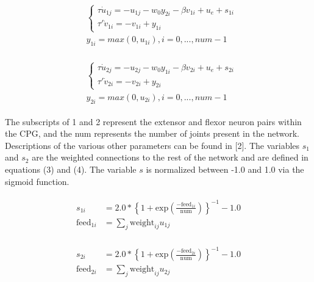 \documentclass{acm_proc_article-sp}
\begin{document}
\begin{multline}
\begin{aligned}
    &\begin{cases}
        \tau\dot{u}_{1j} = -u_{1j} - w_{0}y_{2i} - \beta v_{1i} + u_e + s_{1i} \\
        \tau'\dot{v}_{1i} = -v_{1i} + y_{1i}
    \end{cases}
    \\
    &y_{1i} = max(0, u_{1i}), i = 0,...,num-1
\end{aligned}
\end{multline}

\begin{multline}
\begin{aligned}
    &\begin{cases}
        \tau\dot{u}_{2j} = -u_{2j} - w_{0}y_{1i} - \beta v_{2i} + u_e + s_{2i} \\
        \tau'\dot{v}_{2i} = -v_{2i} + y_{2i}
    \end{cases}
    \\
    &y_{2i} = max(0, u_{2i}), i = 0,...,num-1
\end{aligned}
\end{multline}

The subscripts of 1 and 2 represent the extensor and flexor neuron pairs within the CPG, and the num
represents the number of joints present in the network. Descriptions of
the various other parameters can be found in {[}2{]}. The variables
$s_1$ and $s_2$ are the weighted connections to the rest of the network
and are defined in equations (3) and (4). The variable $s$ is normalized
between -1.0 and 1.0 via the sigmoid function.

\begin{multline}
\begin{aligned}
    s_{1i} &= 2.0 *  \left\{1 + \text{exp}\left(\frac{-\text{feed}_{1i}}{\text{num}}\right)\right\}^{-1} - 1.0 \\ 
    \text{feed}_{1i} &= \sum_j \text{weight}_{ij}u_{1j}
\end{aligned}
\end{multline}

\begin{multline}
\begin{aligned}
    s_{2i} &= 2.0 *  \left\{1 + \text{exp}\left(\frac{-\text{feed}_{2i}}{\text{num}}\right)\right\}^{-1} - 1.0 \\ 
    \text{feed}_{2i} &= \sum_j \text{weight}_{ij}u_{2j}
\end{aligned}
\end{multline}
\end{document}
